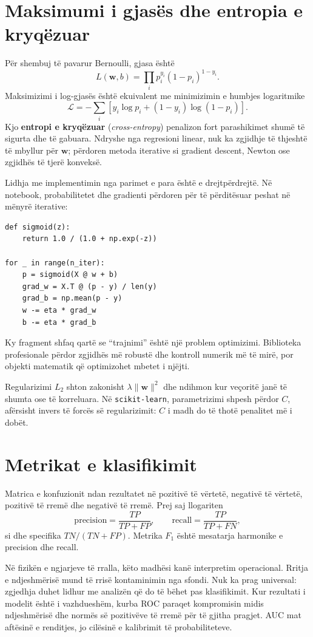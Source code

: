 \documentclass[12pt,a4paper,oneside]{book}
\newcommand{\term}[2]{\textbf{#1} (\textit{#2})}
\begin{document}
\section{Maksimumi i gjasës dhe entropia e kryqëzuar}

Për shembuj të pavarur Bernoulli, gjasa është
\[
L(\mathbf w,b)=\prod_i p_i^{y_i}(1-p_i)^{1-y_i}.
\]
Maksimizimi i log-gjasës është ekuivalent me minimizimin e humbjes logaritmike
\[
\mathcal L=-\sum_i\left[y_i\log p_i+(1-y_i)\log(1-p_i)\right].
\]
Kjo \term{entropi e kryqëzuar}{cross-entropy} penalizon fort parashikimet shumë të sigurta dhe të gabuara. Ndryshe nga regresioni linear, nuk ka zgjidhje të thjeshtë të mbyllur për $\mathbf w$; përdoren metoda iterative si gradient descent, Newton ose zgjidhës të tjerë konveksë.

Lidhja me implementimin nga parimet e para është e drejtpërdrejtë. Në notebook, probabilitetet dhe gradienti përdoren për të përditësuar peshat në mënyrë iterative:
\begin{lstlisting}[caption={Bërthama numerike e regresionit logjistik me zbritje të gradientit.}]
def sigmoid(z):
    return 1.0 / (1.0 + np.exp(-z))

for _ in range(n_iter):
    p = sigmoid(X @ w + b)
    grad_w = X.T @ (p - y) / len(y)
    grad_b = np.mean(p - y)
    w -= eta * grad_w
    b -= eta * grad_b
\end{lstlisting}
Ky fragment shfaq qartë se ``trajnimi'' është një problem optimizimi. Biblioteka profesionale përdor zgjidhës më robustë dhe kontroll numerik më të mirë, por objekti matematik që optimizohet mbetet i njëjti.

Regularizimi $L_2$ shton zakonisht $\lambda\|\mathbf w\|^2$ dhe ndihmon kur veçoritë janë të shumta ose të korreluara. Në \texttt{scikit-learn}, parametrizimi shpesh përdor $C$, afërsisht invers të forcës së regularizimit: $C$ i madh do të thotë penalitet më i dobët.

\section{Metrikat e klasifikimit}

Matrica e konfuzionit ndan rezultatet në pozitivë të vërtetë, negativë të vërtetë, pozitivë të rremë dhe negativë të rremë. Prej saj llogariten
\[
\mathrm{precision}=\frac{TP}{TP+FP},\qquad
\mathrm{recall}=\frac{TP}{TP+FN},
\]
si dhe specifika $TN/(TN+FP)$. Metrika $F_1$ është mesatarja harmonike e precision dhe recall.

Në fizikën e ngjarjeve të rralla, këto madhësi kanë interpretim operacional. Rritja e ndjeshmërisë mund të rrisë kontaminimin nga sfondi. Nuk ka prag universal: zgjedhja duhet lidhur me analizën që do të bëhet pas klasifikimit. Kur rezultati i modelit është i vazhdueshëm, kurba ROC paraqet kompromisin midis ndjeshmërisë dhe normës së pozitivëve të rremë për të gjitha pragjet. AUC mat aftësinë e renditjes, jo cilësinë e kalibrimit të probabiliteteve.
\end{document}
